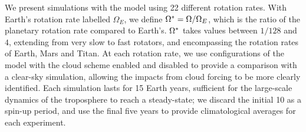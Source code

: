 We present simulations with the model using 22 different rotation rates. With Earth's rotation rate labelled $\Omega_E$, we define $\Omega^* = \Omega/\Omega_E$, which is the ratio of the planetary rotation rate compared to Earth's. $\Omega^*$ takes values between $1/128$ and $4$, extending from very slow to fast rotators, and encompassing the rotation rates of Earth, Mars and Titan. At each rotation rate, we use configurations of the model with the cloud scheme enabled and disabled to provide a comparison with a clear-sky simulation, allowing the impacts from cloud forcing to be more clearly identified. Each simulation lasts for 15 Earth years, sufficient for the large-scale dynamics of the troposphere to reach a steady-state; we discard the initial 10 as a spin-up period, and use the final five years to provide climatological averages for each experiment.